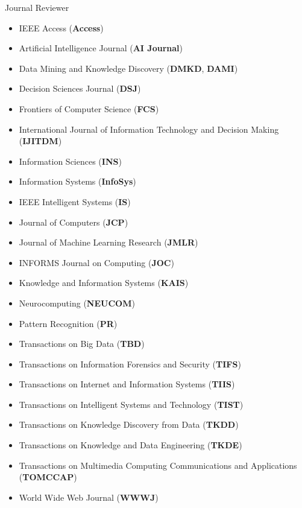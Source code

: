 \documentclass[margin, 9pt]{res}
\begin{document}
\begin{resume}
{Journal Reviewer}
\begin{itemize}
\item IEEE Access (\textbf{Access})
\item Artificial Intelligence Journal (\textbf{AI Journal})	
\item Data Mining and Knowledge Discovery (\textbf{DMKD}, \textbf{DAMI})
\item Decision Sciences Journal (\textbf{DSJ})
\item Frontiers of Computer Science (\textbf{FCS})
\item International Journal of Information Technology and Decision Making (\textbf{IJITDM})
\item Information Sciences (\textbf{INS})
\item Information Systems (\textbf{InfoSys})
\item IEEE Intelligent Systems (\textbf{IS})
\item Journal of Computers (\textbf{JCP})
\item Journal of Machine Learning Research (\textbf{JMLR})
\item INFORMS Journal on Computing (\textbf{JOC})
\item Knowledge and Information Systems (\textbf{KAIS})
\item Neurocomputing (\textbf{NEUCOM})
\item Pattern Recognition (\textbf{PR})
\item Transactions on Big Data (\textbf{TBD})
\item Transactions on Information Forensics and Security (\textbf{TIFS})
\item Transactions on Internet and Information Systems (\textbf{TIIS})
\item Transactions on Intelligent Systems and Technology (\textbf{TIST})
\item Transactions on Knowledge Discovery from Data (\textbf{TKDD})
\item Transactions on Knowledge and Data Engineering (\textbf{TKDE})
\item Transactions on Multimedia Computing Communications and Applications (\textbf{TOMCCAP})
\item World Wide Web Journal (\textbf{WWWJ})
\end{itemize}
\vspace{-0.1in}


\end{resume}
\end{document}

